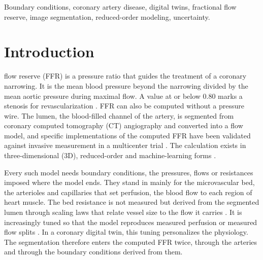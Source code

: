 \documentclass[journal,twoside,web]{ieeecolor}
\begin{document}
\begin{IEEEkeywords}
Boundary conditions, coronary artery disease, digital twins, fractional flow reserve, image segmentation, reduced-order modeling,
uncertainty.
\end{IEEEkeywords}

\section{Introduction}
 flow reserve (FFR) is a pressure ratio that guides the treatment of a coronary narrowing. It is the mean blood pressure beyond the narrowing divided by the mean aortic pressure during maximal flow. A value at or
below 0.80 marks a stenosis for revascularization \cite{tonino2009}. FFR can also be computed without a pressure
wire. The lumen, the blood-filled channel of the artery, is segmented from coronary computed tomography (CT)
angiography and converted into a flow model, and specific implementations of the computed FFR have been validated against invasive measurement
in a multicenter trial \cite{norgaard2014}. The calculation exists in three-dimensional (3D),
reduced-order and machine-learning forms \cite{taylor2013,kim2010,fossan2026,itu2016}.

Every such model needs boundary conditions, the pressures, flows or resistances imposed where the model ends. They
stand in mainly for the microvascular bed, the arterioles and capillaries that set perfusion, the blood flow to each region of heart
muscle. The bed resistance is not measured but derived from the segmented lumen through
scaling laws that relate vessel size to the flow it carries \cite{murray1926,kim2010}. It is increasingly tuned so that the model reproduces measured perfusion \cite{menon2024} or measured flow splits \cite{arminio2026}. In a coronary digital twin, this tuning personalizes the physiology. The segmentation therefore enters the computed FFR twice, through the arteries and through the boundary conditions derived from them.
\end{document}
